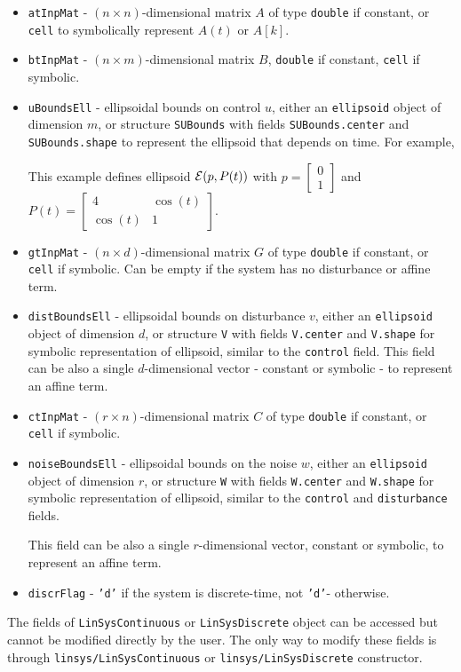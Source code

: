 \begin{itemize}
\item {\tt atInpMat} - $(n\times n)$-dimensional matrix $A$ of type {\tt double}
if constant, or {\tt cell} to symbolically represent $A(t)$ or $A[k]$.
\item {\tt btInpMat} - $(n\times m)$-dimensional matrix $B$, {\tt double} if constant,
{\tt cell} if symbolic.
\item {\tt uBoundsEll} - ellipsoidal bounds on control $u$,
either an {\tt ellipsoid}
object of dimension $m$, or structure {\tt SUBounds} with fields {\tt SUBounds.center} and
{\tt SUBounds.shape} to represent the ellipsoid that depends on time. For example,

This example defines ellipsoid $\EE(p, P(t))$ with $p=\left[\begin{array}{c}
0\\
1\end{array}\right]$ and $P(t) = \left[\begin{array}{cc}
4 & \cos(t)\\
\cos(t) & 1\end{array}\right]$.
\item {\tt gtInpMat} - $(n\times d)$-dimensional matrix $G$ of type {\tt double}
if constant, or {\tt cell} if symbolic. Can be empty if the system has
no disturbance or affine term.
\item {\tt distBoundsEll} - ellipsoidal bounds on disturbance $v$, either an
{\tt ellipsoid} object of dimension $d$, or structure {\tt V} with
fields {\tt V.center} and {\tt V.shape} for symbolic representation of
ellipsoid, similar to the {\tt control} field.
This field can be also a single $d$-dimensional vector - constant or symbolic -
to represent an affine term.
\item {\tt ctInpMat} - $(r\times n)$-dimensional matrix $C$ of type {\tt double}
if constant, or {\tt cell} if symbolic.
\item {\tt noiseBoundsEll} - ellipsoidal bounds on the noise $w$, either an
{\tt ellipsoid} object of dimension $r$, or structure {\tt W} with
fields {\tt W.center} and {\tt W.shape} for symbolic representation of
ellipsoid, similar to the {\tt control} and {\tt disturbance} fields.

This field can be also a single $r$-dimensional vector, constant or symbolic,
to represent an affine term.

\item {\tt discrFlag} - {\tt 'd'} if the system is discrete-time, not {\tt 'd'}- otherwise.
\end{itemize}
The fields of {\tt LinSysContinuous} or {\tt LinSysDiscrete} object can be accessed but cannot be modified
directly by the user. The only way to modify these fields is through
{\tt linsys/LinSysContinuous} or {\tt linsys/LinSysDiscrete} constructor.

